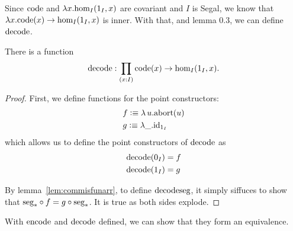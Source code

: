 \documentclass[main.tex]{subfiles}
\begin{document}
Since $\co$ and $\lambda x. \ho[I]{1_I}{x}$ are covariant and $I$ is Segal, we know that $\lambda x. \co(x) \to \ho[I]{1_I}{x}$ is inner. With that, and lemma 0.3, we can define $\dco$.
\begin{lemma}
    There is a function $$\dco : \prod_{(x:I)}\co(x) \to \ho[I]{1_I}{x}.$$
\end{lemma}
\begin{proof}
First, we define functions for the point constructors:
\begin{align*}
    &f \defeq \lambda\, u. \text{abort}(u)\\
    &g \defeq \lambda \_ . \id{1_I}
\end{align*}
which allows us to define the point constructors of $\dco$ as
\begin{align*}
    &\dco(0_I) = f\\
    &\dco(1_I) = g\\
\end{align*}

By lemma~\ref{lem:commisfunarr}, to define $\dco{\seg}$, it simply siffuces to show that $\seg_*\circ f = g \circ \seg_*$. 
It is true as both sides explode.

\end{proof}

With $\eco$ and $\dco$ defined, we can show that they form an equivalence.
\end{document}
